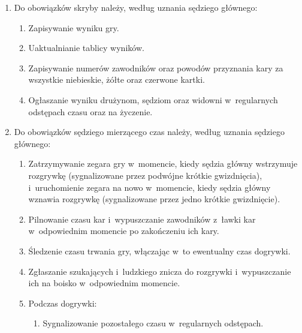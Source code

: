\documentclass[12pt,a4paper]{article}
\begin{document}
\begin{enumerate}
	\item
	      Do obowiązków skryby należy, według uznania sędziego głównego:

	      \begin{enumerate}
		      \item
		            Zapisywanie wyniku gry.
		      \item
		            Uaktualnianie tablicy wyników.
		      \item
		            Zapisywanie numerów zawodników oraz powodów przyznania kary za
		            wszystkie niebieskie, żółte oraz czerwone kartki.
		      \item
		            Ogłaszanie wyniku drużynom, sędziom oraz widowni w~regularnych
		            odstępach czasu oraz na życzenie.
	      \end{enumerate}
	\item
	      Do obowiązków sędziego mierzącego czas należy, według uznania sędziego
	      głównego:

	      \begin{enumerate}
		      \item
		            Zatrzymywanie zegara gry w~momencie, kiedy sędzia główny wstrzymuje
		            rozgrywkę (sygnalizowane przez podwójne krótkie gwizdnięcia), i~uruchomienie zegara na nowo w~momencie, kiedy sędzia główny wznawia
		            rozgrywkę (sygnalizowane przez jedno krótkie gwizdnięcie).
		      \item
		            Pilnowanie czasu kar i~wypuszczanie zawodników z~ławki kar w~odpowiednim momencie po zakończeniu ich kary.
		      \item
		            Śledzenie czasu trwania gry, włączając w~to ewentualny czas
		            dogrywki.
		      \item
		            Zgłaszanie szukających i~ludzkiego znicza do rozgrywki i~wypuszczanie ich na boisko w~odpowiednim momencie.
		      \item
		            Podczas dogrywki:

		            \begin{enumerate}
			            \item
			                  Sygnalizowanie pozostałego czasu w~regularnych odstępach.


\end{enumerate}
\end{enumerate}
\end{enumerate}
\end{document}

